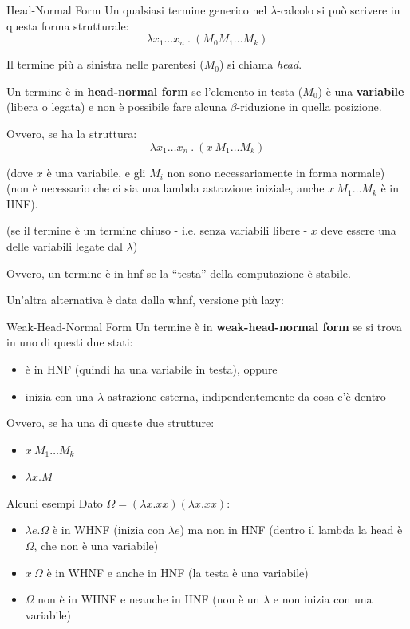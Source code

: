 \begin{defframe}{Head-Normal Form}{}
Un qualsiasi termine generico nel $\lambda$-calcolo si può scrivere in questa forma strutturale:
$$ \lambda x_1 \dots x_n \ . \ (M_0  M_1 \dots M_k)$$

Il termine più a sinistra nelle parentesi ($M_0$) si chiama \textit{head}.

Un termine è in \textbf{head-normal form} se l'elemento in testa ($M_0$) è una \textbf{variabile} (libera o legata) e non è possibile fare alcuna $\beta$-riduzione in quella posizione.

Ovvero, se ha la struttura:
$$ \lambda x_1 \dots x_n \ . \ (x \ M_1 \dots M_k)$$

(dove $x$ è una variabile, e gli $M_i$ non sono necessariamente in forma normale) (non è necessario che ci sia una lambda astrazione iniziale, anche $x \ M_1 \dots M_k$ è in HNF).

(se il termine è un termine chiuso - i.e. senza variabili libere - $x$ deve essere una delle variabili legate dal $\lambda$)

Ovvero, un termine è in hnf se la ``testa'' della computazione è stabile.
\end{defframe}

Un'altra alternativa è data dalla whnf, versione più lazy:

\begin{defframe}{Weak-Head-Normal Form}{}
    Un termine è in \textbf{weak-head-normal form} se si trova in uno di questi due stati:
    \begin{itemize}
        \item è in HNF (quindi ha una variabile in testa), oppure
        \item inizia con una $\lambda$-astrazione esterna, indipendentemente da cosa c'è dentro
    \end{itemize}

    Ovvero, se ha una di queste due strutture:
    \begin{itemize}
        \item $x \ M_1 \dots M_k$
        \item $\lambda x . M$
    \end{itemize}
\end{defframe}

\begin{gframe}{Alcuni esempi}
    Dato $\Omega = (\lambda x . xx) (\lambda x . xx)$:
    \begin{itemize}
        \item $\lambda e . \Omega$ è in WHNF (inizia con $\lambda e$) ma non in HNF (dentro il lambda la head è $\Omega$, che non è una variabile)
        \item $x \ \Omega$ è in WHNF e anche in HNF (la testa è una variabile)
        \item $\Omega$ non è in WHNF e neanche in HNF (non è un $\lambda$ e non inizia con una variabile)
    \end{itemize}
\end{gframe}

